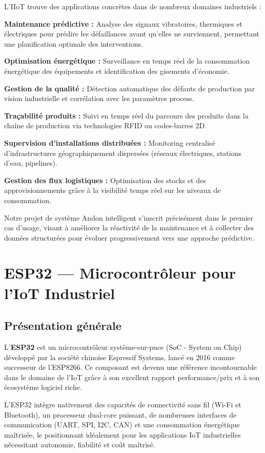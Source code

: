 L'IIoT trouve des applications concrètes dans de nombreux domaines industriels :

\textbf{Maintenance prédictive :} Analyse des signaux vibratoires, thermiques et électriques pour prédire les défaillances avant qu'elles ne surviennent, permettant une planification optimale des interventions.

\textbf{Optimisation énergétique :} Surveillance en temps réel de la consommation énergétique des équipements et identification des gisements d'économie.

\textbf{Gestion de la qualité :} Détection automatique des défauts de production par vision industrielle et corrélation avec les paramètres process.

\textbf{Traçabilité produits :} Suivi en temps réel du parcours des produits dans la chaîne de production via technologies RFID ou codes-barres 2D.

\textbf{Supervision d'installations distribuées :} Monitoring centralisé d'infrastructures géographiquement dispersées (réseaux électriques, stations d'eau, pipelines).

\textbf{Gestion des flux logistiques :} Optimisation des stocks et des approvisionnements grâce à la visibilité temps réel sur les niveaux de consommation.

Notre projet de système Andon intelligent s'inscrit précisément dans le premier cas d'usage, visant à améliorer la réactivité de la maintenance et à collecter des données structurées pour évoluer progressivement vers une approche prédictive.


\section{ESP32 — Microcontrôleur pour l'IoT Industriel}

\subsection{Présentation générale}

L'\textbf{ESP32} est un microcontrôleur système-sur-puce (SoC - System on Chip) développé par la société chinoise Espressif Systems, lancé en 2016 comme successeur de l'ESP8266. Ce composant est devenu une référence incontournable dans le domaine de l'IoT grâce à son excellent rapport performance/prix et à son écosystème logiciel riche.

L'ESP32 intègre nativement des capacités de connectivité sans fil (Wi-Fi et Bluetooth), un processeur dual-core puissant, de nombreuses interfaces de communication (UART, SPI, I2C, CAN) et une consommation énergétique maîtrisée, le positionnant idéalement pour les applications IoT industrielles nécessitant autonomie, fiabilité et coût maîtrisé.

